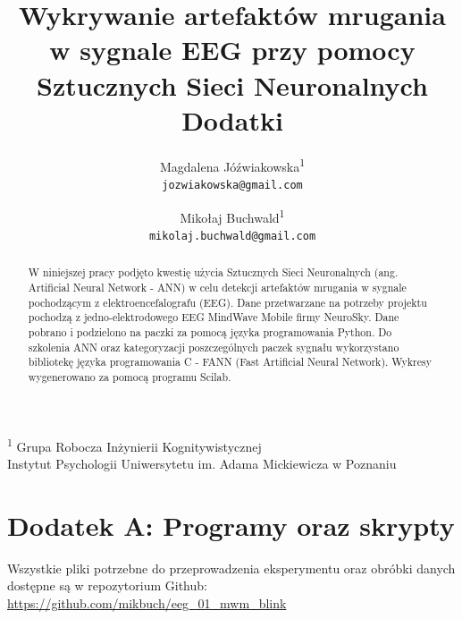 \documentclass{article}
\date{}
\author{
Magdalena Jóźwiakowska\textsuperscript{1}\\\texttt{jozwiakowska@gmail.com}
\and
Mikołaj Buchwald\textsuperscript{1}\\\texttt{mikolaj.buchwald@gmail.com}
}
\title{Wykrywanie artefaktów mrugania w sygnale EEG przy pomocy Sztucznych Sieci Neuronalnych\\Dodatki}
\begin{document}
\maketitle
\textsuperscript{1} Grupa Robocza Inżynierii Kognitywistycznej \\
Instytut Psychologii Uniwersytetu im. Adama Mickiewicza w Poznaniu
\\

\begin{abstract}
    W niniejszej pracy podjęto kwestię użycia Sztucznych Sieci Neuronalnych (ang. Artificial Neural Network - ANN) w celu detekcji artefaktów mrugania w sygnale pochodzącym z elektroencefalografu (EEG). Dane przetwarzane na potrzeby projektu pochodzą z jedno-elektrodowego EEG MindWave Mobile firmy NeuroSky. Dane pobrano i podzielono na paczki za pomocą języka programowania Python. Do szkolenia ANN oraz kategoryzacji poszczególnych paczek sygnału wykorzystano bibliotekę języka programowania C - FANN (Fast Artificial Neural Network). Wykresy wygenerowano za pomocą programu Scilab.
\end{abstract}

    \newpage
    \section*{Dodatek A: Programy oraz skrypty}
        Wszystkie pliki potrzebne do przeprowadzenia eksperymentu oraz obróbki danych dostępne są w repozytorium Github: \\
            \url{https://github.com/mikbuch/eeg\_01\_mwm\_blink} \\
\end{document}

